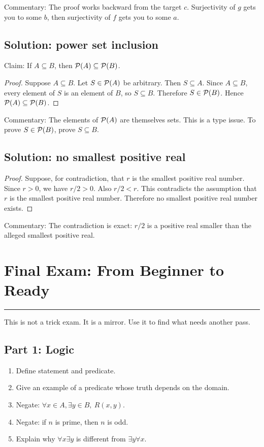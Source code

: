 \documentclass[12pt]{article}
\newcommand{\chapterline}{\vspace{0.4em}\hrule\vspace{0.8em}}
\begin{document}
Commentary: The proof works backward from the target $c$. Surjectivity of $g$ gets you to some $b$, then surjectivity of $f$ gets you to some $a$.

\subsection{Solution: power set inclusion}

Claim: If $A\subseteq B$, then $\mathcal{P}(A)\subseteq\mathcal{P}(B)$.

\begin{proof}
Suppose $A\subseteq B$. Let $S\in\mathcal{P}(A)$ be arbitrary. Then $S\subseteq A$. Since $A\subseteq B$, every element of $S$ is an element of $B$, so $S\subseteq B$. Therefore $S\in\mathcal{P}(B)$. Hence $\mathcal{P}(A)\subseteq\mathcal{P}(B)$.
\end{proof}

Commentary: The elements of $\mathcal{P}(A)$ are themselves sets. This is a type issue. To prove $S\in\mathcal{P}(B)$, prove $S\subseteq B$.

\subsection{Solution: no smallest positive real}

\begin{proof}
Suppose, for contradiction, that $r$ is the smallest positive real number. Since $r>0$, we have $r/2>0$. Also $r/2<r$. This contradicts the assumption that $r$ is the smallest positive real number. Therefore no smallest positive real number exists.
\end{proof}

Commentary: The contradiction is exact: $r/2$ is a positive real smaller than the alleged smallest positive real.

\newpage
\section{Final Exam: From Beginner to Ready}
\chapterline

This is not a trick exam. It is a mirror. Use it to find what needs another pass.

\subsection{Part 1: Logic}

\begin{enumerate}
\item Define statement and predicate.
\item Give an example of a predicate whose truth depends on the domain.
\item Negate: $\forall x\in A,\exists y\in B,\ R(x,y)$.
\item Negate: if $n$ is prime, then $n$ is odd.
\item Explain why $\forall x\exists y$ is different from $\exists y\forall x$.
\end{enumerate}
\end{document}
